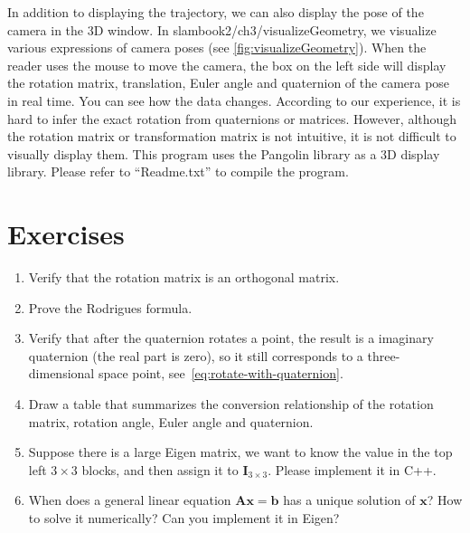 In addition to displaying the trajectory, we can also display the pose of the camera in the 3D window. In slambook2/ch3/visualizeGeometry, we visualize various expressions of camera poses (see \autoref{fig:visualizeGeometry}). When the reader uses the mouse to move the camera, the box on the left side will display the rotation matrix, translation, Euler angle and quaternion of the camera pose in real time. You can see how the data changes. According to our experience, it is hard to infer the exact rotation from quaternions or matrices. However, although the rotation matrix or transformation matrix is not intuitive, it is not difficult to visually display them. This program uses the Pangolin library as a 3D display library. Please refer to ``Readme.txt'' to compile the program.

\section*{Exercises}
\begin{enumerate}
	\item Verify that the rotation matrix is an orthogonal matrix.
	\item Prove the Rodrigues formula.
	\item Verify that after the quaternion rotates a point, the result is a imaginary quaternion (the real part is zero), so it still corresponds to a three-dimensional space point, see~\eqref{eq:rotate-with-quaternion}.
	\item Draw a table that summarizes the conversion relationship of the rotation matrix, rotation angle, Euler angle and quaternion.
	\item Suppose there is a large Eigen matrix, we want to know the value in the top left $3 \times 3$ blocks, and then assign it to $\mathbf{I}_{3 \times 3}$. Please implement it in C++.
	\item When does a general linear equation $\mathbf{A} \mathbf{x}=\mathbf{b}$ has a unique solution of $\mathbf{x}$? How to solve it numerically? Can you implement it in Eigen?
\end{enumerate}
